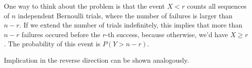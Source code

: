 One way to think about the problem is that the event $X < r$ counts all
sequences of $n$ independent Bernoulli trials, where the number of failures is
larger than $n - r$. If we
extend the number of trials indefinitely,
this implies that more than $n - r$ failures occured before the $r$-th success,
because otherwise, we'd have $X \geq r$. The probability of this event is $P(Y
> n - r)$. 

Implication in the reverse direction can be shown analogously.